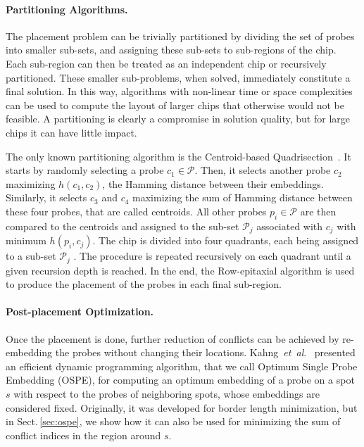 \documentclass[runningheads]{llncs}
\newcommand{\ignore}[1]{}
\begin{document}
\ignore{
The ever growing number of probes on the latest microarrays and the properties of
the placement problem naturally suggest the use of partitioning strategies to reduce
the running time of the algorithms.
}

\paragraph{Partitioning Algorithms.}
The placement problem can be trivially partitioned by
dividing the set of probes into smaller sub-sets, and assigning these sub-sets to
sub-regions of the chip. Each sub-region can then be treated as an independent chip
or recursively partitioned. These smaller sub-problems, when solved, immediately
constitute a final solution. In this way, algorithms with non-linear time or space
complexities can be used to compute the layout of larger chips that otherwise would not
be feasible. A partitioning is clearly a compromise in solution quality, but
for large chips it can have little impact.

The only known partitioning algorithm is the Centroid-based
Quadrisection~\cite{KAHNG03B}. It starts by randomly selecting a probe
$c_1 \in \mathcal{P}$. Then, it selects another probe $c_2$ maximizing
$h(c_1,c_2)$, the Hamming distance between their embeddings. Similarly, it selects
$c_3$ and $c_4$ maximizing the sum of Hamming distance between these four probes,
that are called centroids. All other probes
$p_i \in \mathcal{P}$ are then compared to the centroids and assigned to the sub-set
$\mathcal{P}_j$ associated with $c_j$ with minimum $h(p_i,c_j)$. The chip is divided
into four quadrants, each being assigned to a sub-set $\mathcal{P}_j$ .
The procedure is repeated
recursively on each quadrant until a given recursion depth is reached. In the end,
the Row-epitaxial algorithm is used to produce the placement of the probes in each
final sub-region.

\paragraph{Post-placement Optimization.}
Once the placement is done, further reduction of conflicts can be
achieved by re-embedding the probes without changing their locations.
Kahng~{\it et~al}.~\cite{KAHNG02} presented an efficient dynamic programming
algorithm, that we call Optimum Single Probe Embedding (OSPE), for computing an
optimum embedding of a probe on a spot $s$ with respect to the probes of
neighboring spots, whose embeddings are considered fixed.
Originally, it was developed for border length minimization, but
in Sect.\,\ref{sec:ospe}, we show how it can also be used for minimizing the
sum of conflict indices in the region around $s$.
\end{document}
